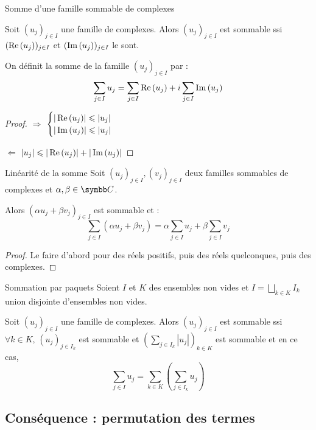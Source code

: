 \begin{theoreme}{Somme d'une famille sommable de complexes}{}

    Soit $(u_j)_{j \in I}$ une famille de complexes. Alors
    $(u_j)_{j\in I}$ est sommable ssi $(\operatorname{Re} \,(u_j))_{j\in I}$ et $(\operatorname{Im} \,(u_j))_{j\in I}$ le sont.

    On définit la somme de la famille $(u_j)_{j \in I}$ par :
    \[\sum_{j \in I} u_j = \sum_{j \in I} \operatorname{Re} \,(u_j) + i \sum_{j \in I} \operatorname{Im} \,(u_j)\]
\end{theoreme}


\begin{proof}
    $\Rightarrow$
    $\begin{cases}
    |\operatorname{Re} \,(u_j)| \leqslant |u_j| \\
    |\operatorname{Im} \,(u_j)| \leqslant |u_j|
    \end{cases}$

    $\Leftarrow$
    $|u_j|\leqslant |\operatorname{Re} \,(u_j)| + |\operatorname{Im} \,(u_j)|$
\end{proof}

\begin{proposition}{Linéarité de la somme}{}
    Soit $(u_j)_{j \in I}, (v_j)_{j \in I}$ deux familles sommables de complexes et $\alpha, \beta \in \C$.

    Alors $(\alpha u_j + \beta v_j)_{j \in I}$ est sommable et :
    \[\sum_{j \in I} (\alpha u_j + \beta v_j) = \alpha \sum_{j \in I} u_j + \beta \sum_{j \in I} v_j\]
\end{proposition}

\begin{proof}
    Le faire d'abord pour des réels positifs, puis des réels quelconques, puis des complexes.
\end{proof}

\begin{theoreme}{Sommation par paquets}{}
    Soient $I$ et $K$ des ensembles non vides et $\displaystyle I = \bigsqcup_{k \in K} I_k$ union
    disjointe d'ensembles non vides.

    Soit $(u_j)_{j \in I}$ une famille de complexes. Alors $(u_j)_{j \in I}$ est sommable ssi
    $\forall k \in K, \, (u_j)_{j \in I_k}$ est sommable et $\displaystyle \left( \sum_{j \in I_k} |u_j| \right)_{k \in K}$ est sommable
    et en ce cas, 
    \[\sum_{j \in I} u_j = \sum_{k \in K} \left( \sum_{j \in I_k} u_j \right)\]
\end{theoreme}

\subsection{Conséquence : permutation des termes}

